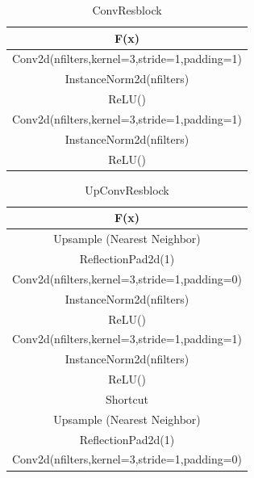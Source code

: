 \documentclass[10pt,twocolumn,letterpaper]{article}
\begin{document}
\begin{table}[ht]
\caption{ConvResblock} %
\centering %
\begin{tabular}{c} %
\hline\hline %
F(x)\\%
\hline
Conv2d(nfilters,kernel=3,stride=1,padding=1) \\
InstanceNorm2d(nfilters)\\ %
ReLU() \\
Conv2d(nfilters,kernel=3,stride=1,padding=1) \\
InstanceNorm2d(nfilters)\\ %
ReLU() \\
\hline %
\end{tabular}
\label{table:convresblock} %
\end{table}


\begin{table}[ht]
\caption{UpConvResblock} %
\centering %
\begin{tabular}{c} %
\hline\hline %
F(x)\\%
\hline
Upsample (Nearest Neighbor) \\
ReflectionPad2d(1) \\
Conv2d(nfilters,kernel=3,stride=1,padding=0) \\
InstanceNorm2d(nfilters)\\ %
ReLU() \\
Conv2d(nfilters,kernel=3,stride=1,padding=1) \\
InstanceNorm2d(nfilters)\\ %
ReLU() \\
\hline %
Shortcut\\
\hline 
Upsample (Nearest Neighbor) \\
ReflectionPad2d(1)\\
Conv2d(nfilters,kernel=3,stride=1,padding=0) \\
\hline
\end{tabular}
\label{table:upconvresblock} %
\end{table}
\end{document}
